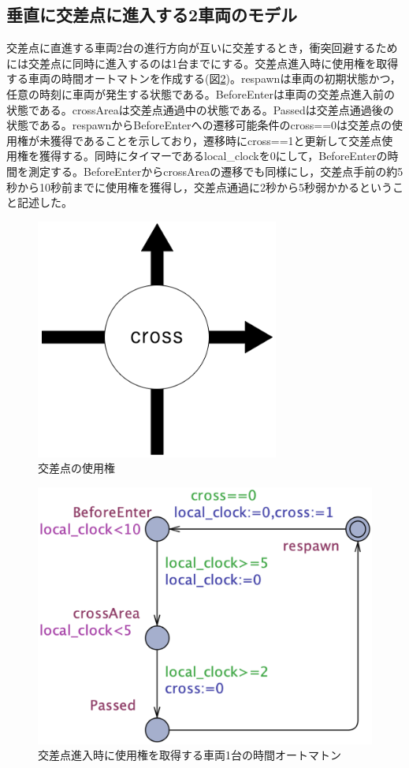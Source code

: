\documentclass{tpu-sotu}
\begin{document}
	\subsection{垂直に交差点に進入する2車両のモデル}
	交差点に直進する車両2台の進行方向が互いに交差するとき，衝突回避するためには交差点に同時に進入するのは1台までにする。交差点進入時に使用権を取得する車両の時間オートマトンを作成する(図\ref{Perpendicular})。respawnは車両の初期状態かつ，任意の時刻に車両が発生する状態である。BeforeEnterは車両の交差点進入前の状態である。crossAreaは交差点通過中の状態である。Passedは交差点通過後の状態である。respawnからBeforeEnterへの遷移可能条件のcross==0は交差点の使用権が未獲得であることを示しており，遷移時にcross==1と更新して交差点使用権を獲得する。同時にタイマーであるlocal\_clockを0にして，BeforeEnterの時間を測定する。BeforeEnterからcrossAreaの遷移でも同様にし，交差点手前の約5秒から10秒前までに使用権を獲得し，交差点通過に2秒から5秒弱かかるということ記述した。
	\begin{figure}[htbp]
	\centering
	\includegraphics[width=80mm]{SimplePerpendicular.png}
	\caption{交差点の使用権}
	\label{SimpleP}
	\end{figure}
	\begin{figure}[htbp]
	\centering
	\includegraphics[width=125mm]{Perpendicular.png}
	\caption{交差点進入時に使用権を取得する車両1台の時間オートマトン}
	\label{Perpendicular}
	\end{figure}
	
\end{document}
